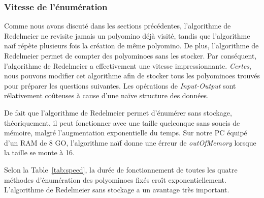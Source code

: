 \documentclass[a4paper,12pt]{article}
\begin{document}
	\subsubsection{Vitesse de l'énumération}
	\par Comme nous avons discuté dans les sections précédentes, l'algorithme de Redelmeier ne revisite jamais un polyomino déjà visité, tandis que l'algorithme naïf répète plusieurs fois la création de même polyomino. De plus, l'algorithme de Redelmeier permet de compter des polyominoes sans les stocker. Par conséquent, l'algorithme de Redelmeier a effectivement une vitesse impressionnante. \textit{Certes}, nous pouvons modifier cet algorithme afin de stocker tous les polyominoes trouvés pour préparer les questions suivantes. Les opérations de \textit{Input-Output} sont rélativement coûteuses à cause d'une naïve structure des données.
	\par De fait que l'algorithme de Redelmeier permet d'énumérer sans stockage, théoriquement, il peut fonctionner avec une taille quelconque sans soucis de mémoire, malgré l'augmentation exponentielle du temps. Sur notre PC équipé d'un RAM de 8 GO, l'algorithme naïf donne une érreur de \textit{outOfMemory} lorsque la taille se monte à 16.
	\par Selon la Table~\ref{tab:speed}, la durée de fonctionnement de toutes les quatre méthodes d'énumération des polyominoes fixés croît exponentiellement. L'algorithme de Redelmeier sans stockage a un avantage très important.
\end{document}
